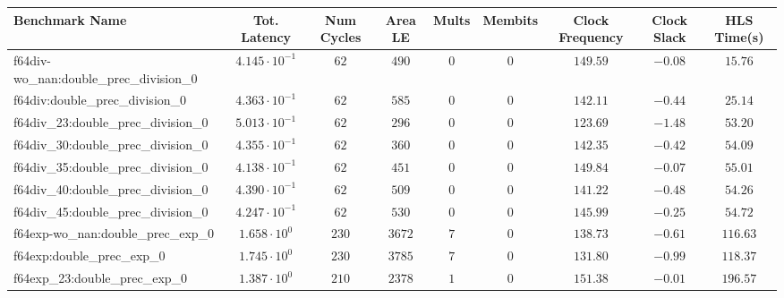 \begin{tabular}{|l|c|c|c|c|c|c|c|c|}
\hline
Benchmark Name                                 & Tot. Latency            & Num Cycles & Area LE    & Mults   & Membits    & Clock Frequency & Clock Slack & HLS Time(s) \\
\hline
f64div-wo\_nan:double\_prec\_division\_0       & $ 4.145 \cdot 10^{-1} $ & $ 62     $ & $ 490    $ & $ 0   $ & $ 0      $ & $ 149.59      $ & $ -0.08   $ & $ 15.76   $ \\
f64div:double\_prec\_division\_0               & $ 4.363 \cdot 10^{-1} $ & $ 62     $ & $ 585    $ & $ 0   $ & $ 0      $ & $ 142.11      $ & $ -0.44   $ & $ 25.14   $ \\
f64div\_23:double\_prec\_division\_0           & $ 5.013 \cdot 10^{-1} $ & $ 62     $ & $ 296    $ & $ 0   $ & $ 0      $ & $ 123.69      $ & $ -1.48   $ & $ 53.20   $ \\
f64div\_30:double\_prec\_division\_0           & $ 4.355 \cdot 10^{-1} $ & $ 62     $ & $ 360    $ & $ 0   $ & $ 0      $ & $ 142.35      $ & $ -0.42   $ & $ 54.09   $ \\
f64div\_35:double\_prec\_division\_0           & $ 4.138 \cdot 10^{-1} $ & $ 62     $ & $ 451    $ & $ 0   $ & $ 0      $ & $ 149.84      $ & $ -0.07   $ & $ 55.01   $ \\
f64div\_40:double\_prec\_division\_0           & $ 4.390 \cdot 10^{-1} $ & $ 62     $ & $ 509    $ & $ 0   $ & $ 0      $ & $ 141.22      $ & $ -0.48   $ & $ 54.26   $ \\
f64div\_45:double\_prec\_division\_0           & $ 4.247 \cdot 10^{-1} $ & $ 62     $ & $ 530    $ & $ 0   $ & $ 0      $ & $ 145.99      $ & $ -0.25   $ & $ 54.72   $ \\
f64exp-wo\_nan:double\_prec\_exp\_0            & $ 1.658 \cdot 10^{0}  $ & $ 230    $ & $ 3672   $ & $ 7   $ & $ 0      $ & $ 138.73      $ & $ -0.61   $ & $ 116.63  $ \\
f64exp:double\_prec\_exp\_0                    & $ 1.745 \cdot 10^{0}  $ & $ 230    $ & $ 3785   $ & $ 7   $ & $ 0      $ & $ 131.80      $ & $ -0.99   $ & $ 118.37  $ \\
f64exp\_23:double\_prec\_exp\_0                & $ 1.387 \cdot 10^{0}  $ & $ 210    $ & $ 2378   $ & $ 1   $ & $ 0      $ & $ 151.38      $ & $ -0.01   $ & $ 196.57  $ \\

\end{tabular}
